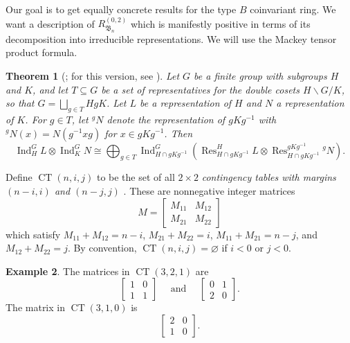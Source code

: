 \documentclass[12pt]{amsart}
\theoremstyle{plain}
\newtheorem{theorem}{Theorem}[section]
\theoremstyle{definition}
\newtheorem{example}[theorem]{Example}
\DeclareMathOperator{\Res}{Res}
\DeclareMathOperator{\Ind}{Ind}
\DeclareMathOperator{\CT}{CT}
\begin{document}
Our goal is to get equally concrete results for the type $B$ coinvariant ring.
We want a description of $R_{\mathfrak{B}_n}^{(0,2)}$ which is manifestly positive in terms of its decomposition into irreducible representations. 
We will use the Mackey tensor product formula.
\begin{theorem}[{\cite{MR974302}; for this version, see \cite[(44.3)]{CurtisReiner}}]\label{thm:mackey-tensor}
Let $G$ be a finite group with subgroups $H$ and $K$, and let $T \subseteq G$ be a set of representatives for the double cosets $H \backslash G / K$, so that $G = \bigsqcup_{g \in T} HgK$. 
Let $L$ be a representation of $H$ and $N$ a
representation of $K$. 
For $g \in T$, let ${}^{g}N$ denote the representation of $gKg^{-1}$ with ${}^{g}N(x) = N(g^{-1} x g)$ for $x \in gKg^{-1}$. 
Then
\begin{equation}
    \Ind_H^G L \otimes \Ind_K^G N \cong \bigoplus_{g \in T}
    \Ind_{H \cap gKg^{-1}}^G \left( \Res_{H \cap gKg^{-1}}^H L \otimes
    \Res_{H \cap gKg^{-1}}^{gKg^{-1}} {}^{g}N \right).
\end{equation}
\end{theorem}

Define $\CT(n,i,j)$ to be the set of all $2 \times 2$ \emph{contingency tables with margins $(n-i,i)$ and $(n-j,j)$} \cite{Pearson}. 
These are nonnegative integer matrices 
\begin{equation}
    M = \begin{bmatrix}
    M_{11} & M_{12} \\
    M_{21} & M_{22}
\end{bmatrix}
\end{equation} which satisfy $M_{11} + M_{12} = n-i$, $M_{21} + M_{22} = i$, $M_{11} + M_{21} = n-j$, and $M_{12} + M_{22} = j$.
By convention, $\CT(n,i,j)=\varnothing$ if $i<0$ or $j<0$.

\begin{example}\label{ex:contingency-tables}
    The matrices in $\CT(3,2,1)$ are 
    \begin{equation}
        \begin{bmatrix}
            1 & 0 \\ 1 & 1
        \end{bmatrix}
        \quad \text{ and } \quad 
                \begin{bmatrix}
            0 & 1 \\ 2 & 0
        \end{bmatrix} .
    \end{equation}
    The matrix in $\CT(3,1,0)$ is 
        \begin{equation}
        \begin{bmatrix}
            2 & 0 \\ 1 & 0
        \end{bmatrix}.
    \end{equation}
\end{example}
\end{document}

